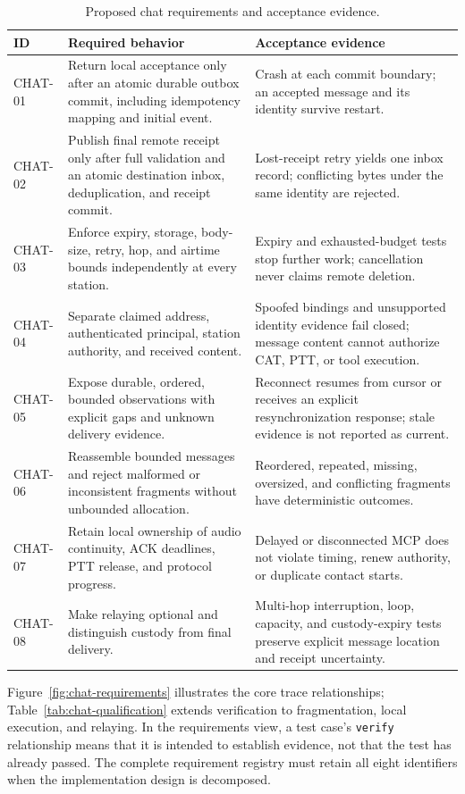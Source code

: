 \begin{longtable}{@{}p{}p{}p{}@{}}
\caption{Proposed chat requirements and acceptance evidence.}\label{tab:chat-requirements}\\
\toprule
\textbf{ID} & \textbf{Required behavior} & \textbf{Acceptance evidence}\\
\midrule
\endhead
CHAT-01 & Return local acceptance only after an atomic durable outbox commit,
including idempotency mapping and initial event. & Crash at each commit boundary;
an accepted message and its identity survive restart.\\
CHAT-02 & Publish final remote receipt only after full validation and an atomic
destination inbox, deduplication, and receipt commit. & Lost-receipt retry yields
one inbox record; conflicting bytes under the same identity are rejected.\\
CHAT-03 & Enforce expiry, storage, body-size, retry, hop, and airtime bounds
independently at every station. & Expiry and exhausted-budget tests stop further
work; cancellation never claims remote deletion.\\
CHAT-04 & Separate claimed address, authenticated principal, station authority,
and received content. & Spoofed bindings and unsupported identity evidence fail
closed; message content cannot authorize CAT, PTT, or tool execution.\\
CHAT-05 & Expose durable, ordered, bounded observations with explicit gaps and
unknown delivery evidence. & Reconnect resumes from cursor or receives an
explicit resynchronization response; stale evidence is not reported as current.\\
CHAT-06 & Reassemble bounded messages and reject malformed or inconsistent
fragments without unbounded allocation. & Reordered, repeated, missing,
oversized, and conflicting fragments have deterministic outcomes.\\
CHAT-07 & Retain local ownership of audio continuity, ACK deadlines, PTT release,
and protocol progress. & Delayed or disconnected MCP does not violate timing,
renew authority, or duplicate contact starts.\\
CHAT-08 & Make relaying optional and distinguish custody from final delivery. &
Multi-hop interruption, loop, capacity, and custody-expiry tests preserve
explicit message location and receipt uncertainty.\\
\bottomrule
\end{longtable}

Figure~\ref{fig:chat-requirements} illustrates the core trace relationships;
Table~\ref{tab:chat-qualification} extends verification to fragmentation,
local execution, and relaying. In the requirements view, a test case's
\texttt{verify} relationship means that it is intended to establish evidence,
not that the test has already passed. The complete requirement registry must
retain all eight identifiers when the implementation design is decomposed.

